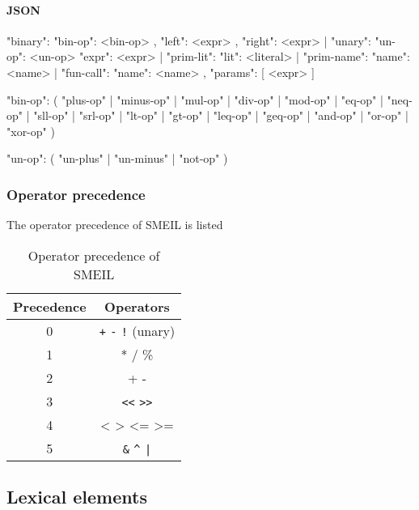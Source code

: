 \documentclass{article}
\begin{document}
\paragraph{JSON}
\begin{jsoncode}
{ "binary": { "bin-op": <bin-op>
            , "left": <expr>
            , "right": <expr>
            }
| "unary": { "un-op": <un-op>
             "expr": <expr>
           }
| "prim-lit": { "lit": <literal> }
| "prim-name": { "name": <name> }
| "fun-call": { "name": <name>
              , "params": [ <expr> ]
              }
}

{ "bin-op": ( "plus-op"
            | "minus-op"
            | "mul-op"
            | "div-op"
            | "mod-op"
            | "eq-op"
            | "neq-op"
            | "sll-op"
            | "srl-op"
            | "lt-op"
            | "gt-op"
            | "leq-op"
            | "geq-op"
            | "and-op"
            | "or-op"
            | "xor-op"
            )
}

{ "un-op": ( "un-plus"
           | "un-minus"
           | "not-op"
           )
}
\end{jsoncode}

\subsubsection{Operator precedence}

The operator precedence of SMEIL is listed 

\begin{table}[H]
  \centering
\begin{tabular}{cc}
  \toprule
  \textbf{Precedence} & \textbf{Operators}\\
  \midrule
  0 & \verb!+! \verb!-! \verb|!| (unary)\\
  1 & * / \% \\
  2 & + - \\
  3 & \verb!<<! \verb!>>! \\
  4 & < > <= >= \\
  5 & \verb!&! \verb!^! \verb!|! \\
  \bottomrule
\end{tabular}
\caption{Operator precedence of SMEIL}
\label{tab:ops}
\end{table}

\subsection{Lexical elements}
\end{document}
